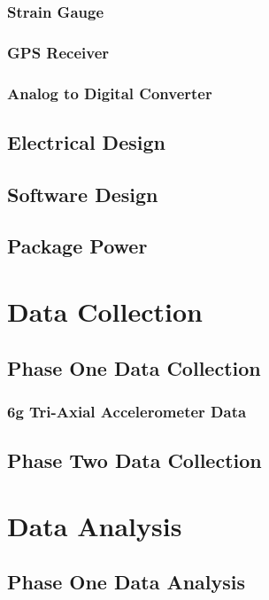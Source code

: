 \documentclass[12pt]{report}
\begin{document}
		\subsection{Strain Gauge}
			
		\subsection{GPS Receiver}
			
		\subsection{Analog to Digital Converter}
			
	\section{Electrical Design}
			
	\section{Software Design}
		
	\section{Package Power}
		
		
\chapter{Data Collection}
\label{ch:DataCollection}
	\section{Phase One Data Collection}
		\subsection{6g Tri-Axial Accelerometer Data}
			
	\section{Phase Two Data Collection}
			
			
			
			
			
		
\chapter{Data Analysis}
\label{ch:DataAnalysis}
	\section{Phase One Data Analysis}
\end{document}

